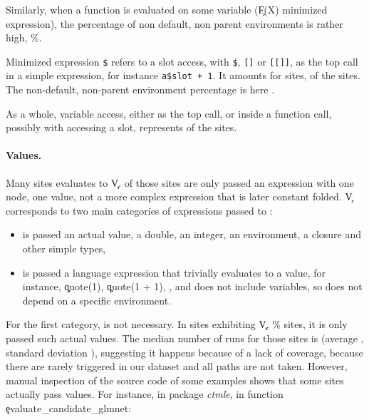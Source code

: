 \documentclass[screen,acmsmall]{acmart}
\begin{document}
Similarly, when a function is evaluated on some variable (\c{F(X)} minimized expression), the percentage of non default, non parent environments is rather high, \packageMinimizedpercentenvirnonparentd\%.


Minimized expression \texttt{\$} refers to a slot access, with \texttt{\$}, \texttt{[]} or \texttt{[[]]}, as the top call in a simple expression, for instance \texttt{a\$slot + 1}.  It amounts for \packageNbSlotAccess sites, \ie \packageSlotAccessPercent of the sites. The non-default, non-parent environment percentage is here \packageMinimizedpercentenvirnonparentg.


As a whole, variable access, either as the top call, or inside a function call, possibly with accessing a slot, represents \packageGeneralizedVarAccessSitePercent of the sites.


\paragraph{Values.}
Many sites evaluates to \c{V}.  \packageValOneNodePercent of those sites are only passed an expression with one node, \ie one value, not a more complex expression that is later constant folded. \c{V} corresponds to two main categories of expressions passed to \eval:

\begin{itemize}
	\item \eval is passed an actual value, a double, an integer, an environment, a closure and other simple types,
	\item \eval is passed a language expression that trivially evaluates to a value, for instance, \c{quote(1)}, \c{quote(1 + 1)}, , and does not include variables, so does not depend on a specific environment.
\end{itemize}

For the first category, \eval is not necessary. In \packageNbCallSitesUniqueActualValue sites exhibiting \c{V}, \ie \packageCallSitesUniqueActualValuePercent\% sites, it is only passed such actual values. The median number of runs for those sites is \packageMedianRunSitesUniqueActualValue (average \packageAverageRunSitesUniqueActualValue, standard deviation \packageSdRunSitesUniqueActualValue), suggesting it happens because of a lack of coverage, because there are rarely triggered in our dataset and all paths are not taken. However, manual inspection of the source code of some examples shows that some sites actually pass values. For instance, in package \emph{ctmle}, in function \c{evaluate\_candidate\_glmnet}:
\end{document}
